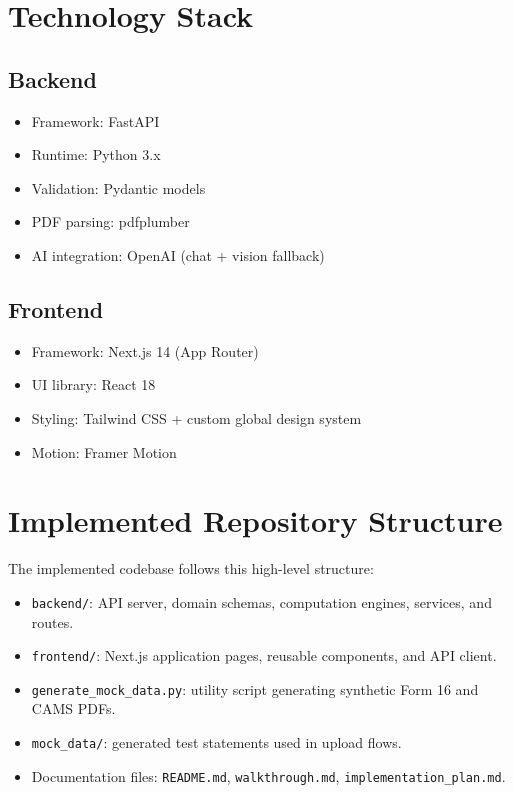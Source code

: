 \documentclass[12pt,a4paper]{article}
\begin{document}
\section{Technology Stack}
\subsection{Backend}
\begin{itemize}
	\item Framework: FastAPI
	\item Runtime: Python 3.x
	\item Validation: Pydantic models
	\item PDF parsing: pdfplumber
	\item AI integration: OpenAI (chat + vision fallback)
\end{itemize}

\subsection{Frontend}
\begin{itemize}
	\item Framework: Next.js 14 (App Router)
	\item UI library: React 18
	\item Styling: Tailwind CSS + custom global design system
	\item Motion: Framer Motion
\end{itemize}

\section{Implemented Repository Structure}
The implemented codebase follows this high-level structure:
\begin{itemize}
	\item \texttt{backend/}: API server, domain schemas, computation engines, services, and routes.
	\item \texttt{frontend/}: Next.js application pages, reusable components, and API client.
	\item \texttt{generate\_mock\_data.py}: utility script generating synthetic Form 16 and CAMS PDFs.
	\item \texttt{mock\_data/}: generated test statements used in upload flows.
	\item Documentation files: \texttt{README.md}, \texttt{walkthrough.md}, \texttt{implementation\_plan.md}.
\end{itemize}
\end{document}
